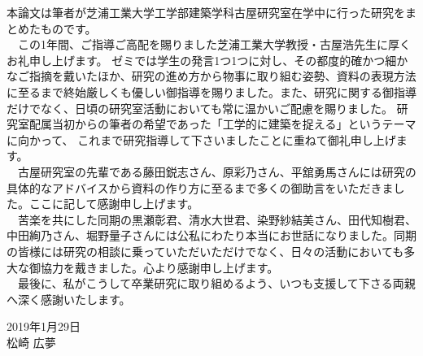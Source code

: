 \begin{acknowledgment}
\thispagestyle{fancy}
本論文は筆者が芝浦工業大学工学部建築学科古屋研究室在学中に行った研究をまとめたものです。
\\　この1年間、ご指導ご高配を賜りました芝浦工業大学教授・古屋浩先生に厚くお礼申し上げます。
ゼミでは学生の発言1つ1つに対し、その都度的確かつ細かなご指摘を戴いたほか、研究の進め方から物事に取り組む姿勢、資料の表現方法に至るまで終始厳しくも優しい御指導を賜りました。また、研究に関する御指導だけでなく、日頃の研究室活動においても常に温かいご配慮を賜りました。
研究室配属当初からの筆者の希望であった「工学的に建築を捉える」というテーマに向かって、
これまで研究指導して下さいましたことに重ねて御礼申し上げます。
\\　古屋研究室の先輩である藤田鋭志さん、原彩乃さん、平舘勇馬さんには研究の具体的なアドバイスから資料の作り方に至るまで多くの御助言をいただきました。ここに記して感謝申し上げます。
\\　苦楽を共にした同期の黒瀬彰君、清水大世君、染野紗結美さん、田代知樹君、中田絢乃さん、堀野量子さんには公私にわたり本当にお世話になりました。同期の皆様には研究の相談に乗っていただいただけでなく、日々の活動においても多大な御協力を戴きました。心より感謝申し上げます。
\\　最後に、私がこうして卒業研究に取り組めるよう、いつも支援して下さる両親へ深く感謝いたします。
\\
\begin{flushright}
2019年1月29日\\
松崎 広夢
\end{flushright}
\end{acknowledgment}
